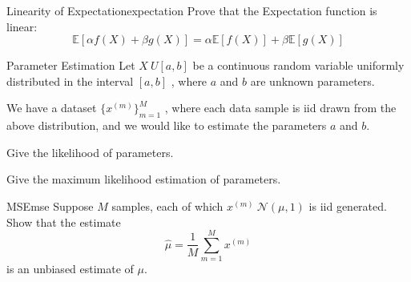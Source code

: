 

\begin{problem}{Linearity of Expectation}{expectation}
  Prove that the Expectation function is linear:
  \begin{equation*}
    \mathbb{E}[\alpha f(X) + \beta g(X)] = \alpha\mathbb{E}[f(X)] + \beta\mathbb{E}[g(X)]
  \end{equation*}
\end{problem}



\begin{problem}{Parameter Estimation}
  Let $X~U[a,b]$ be a continuous random variable uniformly distributed in the interval $[a, b]$ , where $a$ and $b$ are unknown parameters.

We have a dataset $\{x^{(m)}\}^{M}_{m=1}$ , where each data sample is iid drawn from the above distribution, and we would like to estimate the parameters $a$ and $b$.

Give the likelihood of parameters.

Give the maximum likelihood estimation of parameters.
\end{problem}



\begin{problem}{MSE}{mse}
  Suppose $M$ samples, each of which $x^{(m)}~\mathcal{N}(\mu,1)$ is iid generated. Show that the estimate
\begin{equation*}
  \hat{\mu} = \frac{1}{M}\sum^{M}_{m=1}x^{(m)}
\end{equation*}
is an unbiased estimate of $\mu$.
\end{problem}









